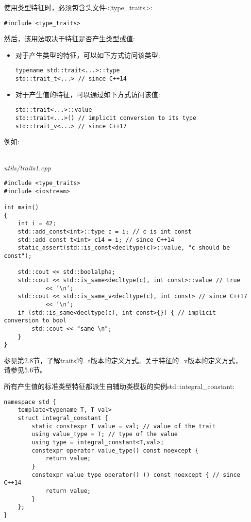 
使用类型特征时，必须包含头文件<type\_traits>:

\begin{lstlisting}[style=styleCXX]
#include <type_traits>
\end{lstlisting}

然后，该用法取决于特征是否产生类型或值:

\begin{itemize}
\item 
对于产生类型的特征，可以如下方式访问该类型:
\begin{lstlisting}[style=styleCXX]
typename std::trait<...>::type
std::trait_t<...> // since C++14
\end{lstlisting}

\item 
对于产生值的特征，可以通过如下方式访问该值:
\begin{lstlisting}[style=styleCXX]
std::trait<...>::value
std::trait<...>() // implicit conversion to its type
std::trait_v<...> // since C++17
\end{lstlisting}
\end{itemize}

例如:

\hspace*{\fill} \\ %
\noindent
\textit{utils/traits1.cpp}
\begin{lstlisting}[style=styleCXX]
#include <type_traits>
#include <iostream>

int main()
{
	int i = 42;
	std::add_const<int>::type c = i; // c is int const
	std::add_const_t<int> c14 = i; // since C++14
	static_assert(std::is_const<decltype(c)>::value, "c should be const");
	
	std::cout << std::boolalpha;
	std::cout << std::is_same<decltype(c), int const>::value // true
			<< ’\n’;
	std::cout << std::is_same_v<decltype(c), int const> // since C++17
			<< ’\n’;
	if (std::is_same<decltype(c), int const>{}) { // implicit conversion to bool
		std::cout << "same \n";
	}
}
\end{lstlisting}

参见第2.8节，了解traits的\_t版本的定义方式。关于特征的\_v版本的定义方式，请参见5.6节。


所有产生值的标准类型特征都派生自辅助类模板的实例std::integral\_constant:

\begin{lstlisting}[style=styleCXX]
namespace std {
	template<typename T, T val>
	struct integral_constant {
		static constexpr T value = val; // value of the trait
		using value_type = T; // type of the value
		using type = integral_constant<T,val>;
		constexpr operator value_type() const noexcept {
			return value;
		}
		constexpr value_type operator() () const noexcept { // since C++14
			return value;
		}
	};
}
\end{lstlisting}

